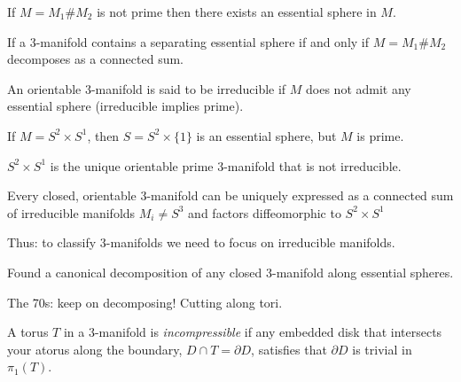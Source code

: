 \begin{example}
\label{example-not-prime-essential}
If $M = M_1 \# M_2$ is not prime
then there exists an essential sphere in
$M$.
\end{example}

\begin{theorem}
\label{theorem-essential-sphere-connected-sum}
If a 3-manifold contains a separating
essential sphere if and only if $M=M_1 \#
M_2$ decomposes as a connected sum.
\end{theorem}

\begin{definition}
\label{definition-irreducible-mfd}
An orientable 3-manifold is said to be
irreducible if $M$ does not admit any
essential sphere (irreducible implies
prime).
\end{definition}

\begin{example}
\label{example-essential-prime}
If $M = S^2 \times S^1$, then
$S = S^2 \times \{1\}$ is an essential
sphere,
 but $M$ is prime.
\end{example}

\begin{theorem}
\label{theorem-unique-prime-not-irreduc}
$S^2 \times S^1$ is the unique orientable
prime 3-manifold that is not irreducible.
\end{theorem}

\begin{theorem}
\label{theorem-}
Every closed, orientable 3-manifold can be
uniquely
expressed as a connected sum of irreducible
manifolds $M_i \neq S^3$ and factors
diffeomorphic to $S^2 \times S^1$
\end{theorem}

\noindent
Thus: to classify 3-manifolds we need to
focus on irreducible manifolds.

\begin{theorem}
\label{theorem-kneser29-milnor62}
Found a canonical decomposition of any
closed 3-manifold along essential spheres.
\end{theorem}

\medskip\noindent
The 70s: keep on decomposing!
Cutting along tori.

\begin{definition}
\label{definition-incompressible-torus}
A torus $T$ in a 3-manifold is {\it
incompressible} if any embedded disk that
intersects your atorus along the boundary,
$D \cap T = \partial D$, satisfies that
$\partial D$ is trivial in $\pi_1(T)$.
\end{definition}

